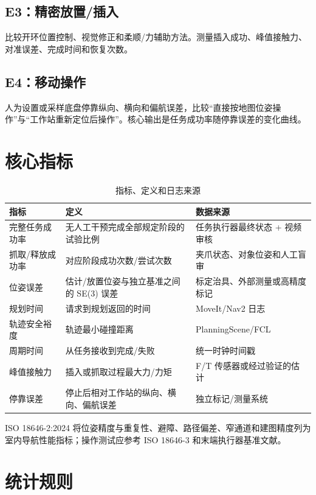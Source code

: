 \documentclass[UTF8,12pt,oneside]{ctexrep}
\begin{document}
\subsection{E3：精密放置/插入}

比较开环位置控制、视觉修正和柔顺/力辅助方法。测量插入成功、峰值接触力、对准误差、完成时间和恢复次数。

\subsection{E4：移动操作}

人为设置或采样底盘停靠纵向、横向和偏航误差，比较“直接按地图位姿操作”与“工作站重新定位后操作”。核心输出是任务成功率随停靠误差的变化曲线。

\section{核心指标}

\begin{table}[H]
\centering
\caption{指标、定义和日志来源}
\begin{tabularx}{\textwidth}{L{3cm}L{6cm}Y}
\toprule
指标 & 定义 & 数据来源 \\
\midrule
完整任务成功率 & 无人工干预完成全部规定阶段的试验比例 & 任务执行器最终状态 + 视频审核 \\
抓取/释放成功率 & 对应阶段成功次数/尝试次数 & 夹爪状态、对象位姿和人工盲审 \\
位姿误差 & 估计/放置位姿与独立基准之间的 SE(3) 误差 & 标定治具、外部测量或高精度标记 \\
规划时间 & 请求到规划返回的时间 & MoveIt/Nav2 日志 \\
轨迹安全裕度 & 轨迹最小碰撞距离 & PlanningScene/FCL\cite{pan2012fcl} \\
周期时间 & 从任务接收到完成/失败 & 统一时钟时间戳 \\
峰值接触力 & 插入或抓取过程最大力/力矩 & F/T 传感器或经过验证的估计 \\
停靠误差 & 停止后相对工作站的纵向、横向、偏航误差 & 独立标记/测量系统 \\
\bottomrule
\end{tabularx}
\end{table}

ISO 18646-2:2024 将位姿精度与重复性、避障、路径偏差、窄通道和建图精度列为室内导航性能指标\cite{iso18646_2_2024}；操作测试应参考 ISO 18646-3 和末端执行器基准文献\cite{iso18646_3_2021,falco2020gripperbench}。

\section{统计规则}
\end{document}
